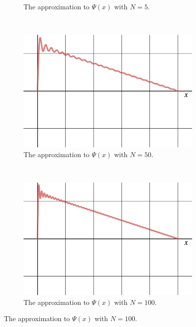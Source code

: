 \documentclass[12pt]{article} %
\begin{document}
\begin{solution}
\begin{enumerate}[(a)]
\begin{figure}[H]
\begin{subfigure}[h]{0.48\textwidth}
			\caption{The approximation to $\Psi(x)$ with $N=5$.}
		\end{subfigure}
		\\
		\begin{subfigure}[h]{0.48\textwidth}
			\centering
			\includegraphics[width=.8\textwidth]{n=50.png}
			\caption{The approximation to $\Psi(x)$ with $N=50$.}
		\end{subfigure}
		~
		\begin{subfigure}[h]{0.48\textwidth}
			\centering
			\includegraphics[width=.8\textwidth]{n=100.png}
			\caption{The approximation to $\Psi(x)$ with $N=100$.}
		\end{subfigure}
	\end{figure}
	\end{enumerate}
\end{solution}
\end{document}
